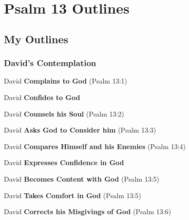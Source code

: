 \section{Psalm 13 Outlines}

\subsection{My Outlines}

\subsubsection{David's Contemplation}
\begin{compactenum}[I.][9]
    \item David \textbf{Complains to God} (Psalm 13:1)
    \item David \textbf{Confides to God} 
    \item David \textbf{Counsels his Soul}   (Psalm 13:2)    
    \item David \textbf{Asks God to Consider him}   (Psalm 13:3)
    \item David \textbf{Compares Himself and his Enemies} (Psalm 13:4)
    \item David \textbf{Expresses Confidence in God}
    \item David \textbf{Becomes Content with God} (Psalm 13:5)
    \item David \textbf{Takes Comfort in God}  (Psalm 13:5)
    \item David \textbf{Corrects his Misgivings of God}  (Psalm 13:6)
\end{compactenum}


